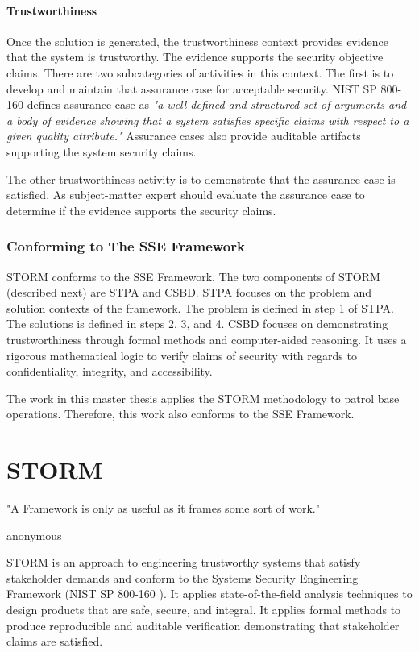 \documentclass[../../main/main.tex]{subfiles}
\begin{document}
\paragraph*{Trustworthiness}
Once the solution is generated, the trustworthiness context provides evidence that the system is trustworthy.  The evidence supports the security objective claims.  There are two subcategories of activities in this context.  The first is to develop and maintain that assurance case for acceptable security.  NIST SP 800-160 defines assurance case as \textit{"a well-defined and structured set of arguments and a body of evidence showing that a system satisfies specific claims with respect to a given quality attribute."}  Assurance cases also provide auditable artifacts supporting the system security claims.

The other trustworthiness activity is to demonstrate that the assurance case is satisfied.  As subject-matter expert should evaluate the assurance case to determine if the evidence supports the security claims.

\subsubsection{Conforming to The SSE Framework}
STORM conforms to the SSE Framework.  The two components of STORM (described next) are STPA and CSBD.  STPA focuses on the problem and solution contexts of the framework.  The problem is defined in step 1 of STPA.  The solutions is defined in steps 2, 3, and 4. CSBD focuses on demonstrating trustworthiness through formal methods and computer-aided reasoning.  It uses a rigorous mathematical logic to verify claims of security with regards to confidentiality, integrity, and accessibility.  

The work in this master thesis applies the STORM methodology to patrol base operations.  Therefore, this work also conforms to the SSE Framework.


\section{STORM}\label{sec:storm}
"A Framework is only as useful as it frames some sort of work."

anonymous

STORM is an approach to engineering trustworthy systems that satisfy stakeholder demands and conform to the Systems Security Engineering Framework (NIST SP 800-160 \cite{}).  It applies state-of-the-field analysis techniques to design products that are safe, secure, and integral.  It applies formal methods to produce reproducible and auditable verification demonstrating that stakeholder claims are satisfied.
\end{document}
